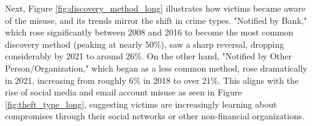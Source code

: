 

Next, Figure \ref{fig:discovery_method_long} illustrates how victims became aware of the misuse, and its trends mirror the shift in crime types. "Notified by Bank," which rose significantly between 2008 and 2016 to become the most common discovery method (peaking at nearly 50\%), saw a sharp reversal, dropping considerably by 2021 to around 26\%. On the other hand, "Notified by Other Person/Organization," which began as a less common method, rose dramatically in 2021, increasing from roughly 6\% in 2018 to over 21\%. This aligns with the rise of social media and email account misuse as seen in Figure \ref{fig:theft_type_long}, suggesting victims are increasingly learning about compromises through their social networks or other non-financial organizations.



